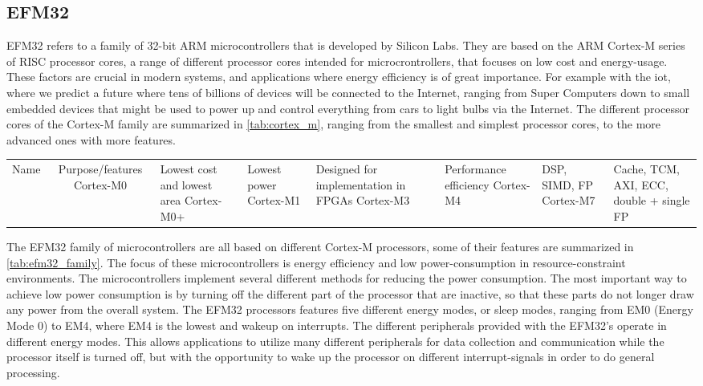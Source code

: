
\subsection{EFM32}
\label{sub:emf32}

EFM32 refers to a family of 32-bit ARM microcontrollers that is developed by Silicon Labs. They are
based on the ARM Cortex-M series of RISC processor cores, a range of different processor cores
intended for microcrontrollers, that focuses on low cost and energy-usage. These factors are crucial
in modern systems, and applications where energy efficiency is of great importance. For example with
the \gls{iot}, where we predict a future where tens of billions of devices will be connected to the
Internet, ranging from Super Computers down to small embedded devices that might be used to power up
and control everything from cars to light bulbs via the Internet. The different processor cores of
the Cortex-M family are summarized in \autoref{tab:cortex_m}, ranging from the smallest and simplest
processor cores, to the more advanced ones with more features.

\begin{centering}
\begin{tabular}{c|c}
Name & Purpose/features
Cortex-M0 & Lowest cost and lowest area
Cortex-M0+ & Lowest power
Cortex-M1 & Designed for implementation in FPGAs
Cortex-M3 & Performance efficiency
Cortex-M4 & DSP, SIMD, FP
Cortex-M7 & Cache, TCM, AXI, ECC, double + single FP
\caption{Cortex-M}
\label{tab:cortex_m}
\end{tabular}
\end{centering}

The EFM32 family of microcontrollers are all based on different Cortex-M processors, some of their
features are summarized in \autoref{tab:efm32_family}. The focus of these microcontrollers is energy
efficiency and low power-consumption in resource-constraint environments. The microcontrollers
implement several different methods for reducing the power consumption. The most important way to
achieve low power consumption is by turning off the different part of the processor that are
inactive, so that these parts do not longer draw any power from the overall system. The EFM32
processors features five different energy modes, or sleep modes, ranging from EM0 (Energy Mode 0) to
EM4, where EM4 is the lowest and wakeup on interrupts. The different peripherals provided with the
EFM32's operate in different energy modes. This allows applications to utilize many different
peripherals for data collection and communication while the processor itself is turned off, but with
the opportunity to wake up the processor on different interrupt-signals in order to do general
processing.

